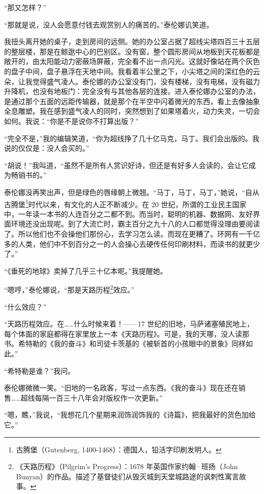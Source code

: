 \documentclass[AutoFakeBold=true]{book}
\begin{document}
``那又怎样？''

``那就是说，没人会愿意付钱去观赏别人的痛苦的。''泰伦娜讥笑道。

我扭头离开她的桌子，走到房间的远侧。她的办公室占据了超线尖塔四百三十五层的整层楼，那是在鲸逖中心的巴别区。没有窗，整个圆形房间从地板到天花板都是敞开的，由太阳能动力密蔽场屏蔽，完全看不出一点闪光。这就好像站在两个灰色的盘子中间，盘子悬浮在天地中间。我看着半公里之下，小尖塔之间的深红色的云朵，让我觉得盛气凌人。泰伦娜的办公室没有门，没有楼梯，没有电梯，没有磁力升降机，也没有地板门：完全没有与其他各层的连接。进入泰伦娜办公室的办法，是通过那个五面的远距传输器，就是那个在半空中闪着微光的东西，看上去像抽象全息雕塑。我在感到盛气凌人的同时，突然想到了如果塔着火，动力失灵，一切会如何。我说：``你是不是说你不打算出版？''

``完全不是，''我的编辑笑道，``你为超线挣了几十亿马克，马丁。我们会出版的。我说的仅仅是：没人会买的。''

``胡说！''我叫道，``虽然不是所有人赏识好诗，但还是有好多人会读的，会让它成为畅销书的。''

泰伦娜没再笑出声，但是绿色的唇缘朝上微翘。``马丁，马丁，马丁，''她说，``自从古腾堡\footnote{古腾堡（Gutenberg, 1400-1468）：德国人，铅活字印刷发明人。}时代以来，有文化的人正不断减少。在 20 世纪，所谓的工业民主国家中，一年读一本书的人连百分之二都不到。而当时，聪明的机器、数据网、友好界面环境还没出现呢。到了大流亡时，霸主百分之九十八的人口都觉得没理由要阅读了。所以他们也不会操他们那份心，去学习怎么读。而现在更糟了。环网有一千亿多的人类，他们中不到百分之一的人会操心去硬传任何印刷材料，而读书的就更少了。''

``《垂死的地球》卖掉了几乎三十亿本呢。''我提醒她。

``嗯哼，''泰伦娜说，``那是天路历程\footnote{《天路历程》（Pilgrim's Progress）：1678 年英国作家约翰·班扬（John Bunyan）的作品。描述了基督徒们从毁灭城到天堂城路途的讽刺性寓言故事。}效应。''

``什么效应？''

``天路历程效应。在……什么时候来着！——17 世纪的旧地，马萨诸塞殖民地上，每个体面的家庭都得在家里放上一本《天路历程》。可是，我的天哪，没人读那书。希特勒的《我的奋斗》和司徒卡茨基的《被斩首的小孩眼中的景象》同样如此。''

``希特勒是谁？''我问。

泰伦娜微微一笑。``旧地的一名政客，写过一点东西。《我的奋斗》现在还在销售……超线每隔一百三十八年会对版权作一次更新。''

``嗯，瞧，''我说，``我想花几个星期来润饰润饰我的《诗篇》，把我最好的货色加给它。''
\end{document}
